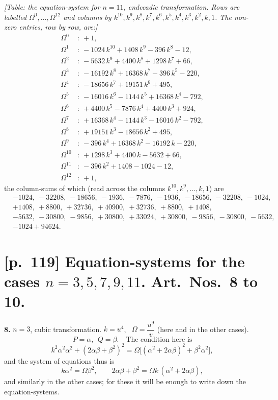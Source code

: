\documentclass[11pt]{article}
\begin{document}
\vspace{1ex}
\noindent\textit{[Table: the equation-system for $n=11$, endecadic
transformation. Rows are labelled $\Omega^0,\ldots,\Omega^{12}$ and columns
by $k^{10}, k^9, k^8, k^7, k^6, k^5, k^4, k^3, k^2, k, 1$. The non-zero
entries, row by row, are:]}
\[
\begin{aligned}
\Omega^0 &:\ +1, \\
\Omega^1 &:\ -1024\,k^{10} + 1408\,k^9 - 396\,k^8 - 12, \\
\Omega^2 &:\ -5632\,k^9 + 4400\,k^8 + 1298\,k^7 + 66, \\
\Omega^3 &:\ -16192\,k^8 + 16368\,k^7 - 396\,k^5 - 220, \\
\Omega^4 &:\ -18656\,k^7 + 19151\,k^6 + 495, \\
\Omega^5 &:\ -16016\,k^6 - 1144\,k^5 + 16368\,k^4 - 792, \\
\Omega^6 &:\ +4400\,k^5 - 7876\,k^4 + 4400\,k^3 + 924, \\
\Omega^7 &:\ +16368\,k^4 - 1144\,k^3 - 16016\,k^2 - 792, \\
\Omega^8 &:\ +19151\,k^3 - 18656\,k^2 + 495, \\
\Omega^9 &:\ -396\,k^4 + 16368\,k^2 - 16192\,k - 220, \\
\Omega^{10} &:\ +1298\,k^3 + 4400\,k - 5632 + 66, \\
\Omega^{11} &:\ -396\,k^2 + 1408 - 1024 - 12, \\
\Omega^{12} &:\ +1,
\end{aligned}
\]
the column-sums of which (read across the columns
$k^{10},k^9,\ldots,k,1$) are
\[
\begin{aligned}
&-1024,\ -32208,\ -18656,\ -1936,\ -7876,\ -1936,\ -18656,\ -32208,\ -1024,\\
&+1408,\ +8800,\ +32736,\ +40900,\ +32736,\ +8800,\ +1408,\\
&-5632,\ -30800,\ -9856,\ +30800,\ +33024,\ +30800,\ -9856,\ -30800,\ -5632,\\
&-1024 + 94624.
\end{aligned}
\]

\section*{[p.~119] Equation-systems for the cases $n=3,5,7,9,11$. Art.\ Nos.\ 8 to 10.}

\textbf{8.} $n=3$, cubic transformation. \quad $k=u^4$, \
$\Omega=\dfrac{u^9}{v}$ (here and in the other cases).
\[
P=\alpha,\ \ Q=\beta. \quad \text{The condition here is}
\]
\[
k^2\alpha^2\alpha^2 + (2\alpha\beta+\beta^2)^2 = \Omega\bigl[(\alpha^2+2\alpha\beta)^2 + \beta^2 \alpha^2\bigr],
\]
and the system of equations thus is
\[
k\alpha^2 = \Omega\beta^2,\qquad
2\alpha\beta + \beta^2 = \Omega k\,(\alpha^2 + 2\alpha\beta),
\]
and similarly in the other cases; for these it will be enough to write down
the equation-systems.
\end{document}
